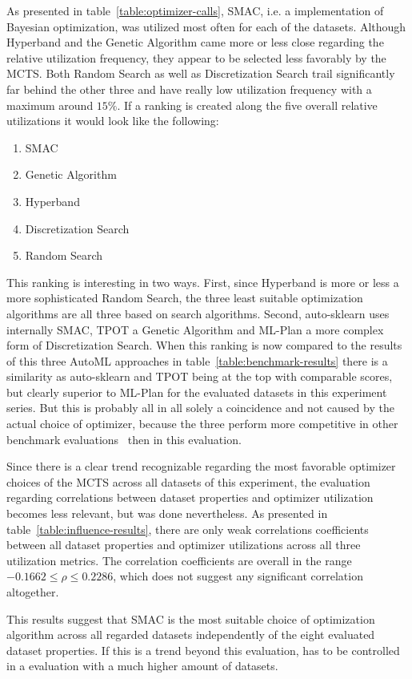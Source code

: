 As presented in table~\ref{table:optimizer-calls}, SMAC, i.e. a implementation of Bayesian optimization, was utilized most often for each of the datasets.
Although Hyperband and the Genetic Algorithm came more or less close regarding the relative utilization frequency, they appear to be selected less favorably by the MCTS.
Both Random Search as well as Discretization Search trail significantly far behind the other three and have really low utilization frequency with a maximum around $15\%$.\newline
If a ranking is created along the five overall relative utilizations it would look like the following:
\begin{enumerate}
    \item SMAC
    \item Genetic Algorithm
    \item Hyperband
    \item Discretization Search
    \item Random Search
\end{enumerate}
This ranking is interesting in two ways.
First, since Hyperband is more or less a more sophisticated Random Search, the three least suitable optimization algorithms are all three based on search algorithms.
Second, auto-sklearn uses internally SMAC, TPOT a Genetic Algorithm and ML-Plan a more complex form of Discretization Search.
When this ranking is now compared to the results of this three AutoML approaches in table~\ref{table:benchmark-results} there is a similarity as auto-sklearn and TPOT being at the top with comparable scores, but clearly superior to ML-Plan for the evaluated datasets in this experiment series.
But this is probably all in all solely a coincidence and not caused by the actual choice of optimizer, because the three perform more competitive in other benchmark evaluations~\cite{Mohr-ML-Plan} then in this evaluation.

Since there is a clear trend recognizable regarding the most favorable optimizer choices of the MCTS across all datasets of this experiment, the evaluation regarding correlations between dataset properties and optimizer utilization becomes less relevant, but was done nevertheless.
As presented in table~\ref{table:influence-results}, there are only weak correlations coefficients between all dataset properties and optimizer utilizations across all three utilization metrics.
The correlation coefficients are overall in the range $-0.1662 \leq \rho \leq 0.2286$, which does not suggest any significant correlation altogether.

This results suggest that SMAC is the most suitable choice of optimization algorithm across all regarded datasets independently of the eight evaluated dataset properties.
If this is a trend beyond this evaluation, has to be controlled in a evaluation with a much higher amount of datasets.
